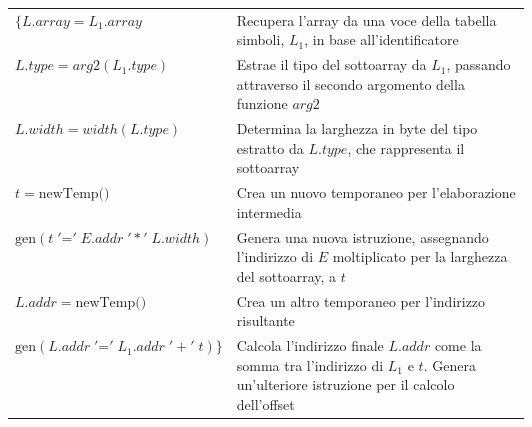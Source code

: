 \documentclass[11pt]{article}
\begin{document}
\begin{center}
  \begin{tabularx}{\linewidth}{l m{0.6\linewidth}}
  $\{L.array = L_1.array$
      & \small Recupera l'array da una voce della tabella simboli, $L_1$, in base all'identificatore \\[0.3cm]
  
  $L.type = arg2(L_1.type)$
      & \small Estrae il tipo del sottoarray da $L_1$, passando attraverso il secondo argomento della funzione $arg2$ \\[0.3cm]
  
  $ L.width = width(L.type) $
      & \small Determina la larghezza in byte del tipo estratto da $L.type$, che rappresenta il sottoarray \\[0.3cm]
  
  $ t = \text{newTemp()} $
      & \small Crea un nuovo temporaneo per l'elaborazione intermedia \\[0.3cm]
  
  $ \text{gen}(t \;'\mathord{=}'\; E.addr \;'*'\; L.width)$
      & \small Genera una nuova istruzione, assegnando l'indirizzo di $E$ moltiplicato per la larghezza del sottoarray, a $t$ \\[0.3cm]
  
  $ L.addr = \text{newTemp()} $
      & \small Crea un altro temporaneo per l'indirizzo risultante \\[0.3cm]
  
  $ \text{gen}(L.addr \;'\mathord{=}'\; L_1.addr \;'+'\; t )\}$
      & \small Calcola l'indirizzo finale $L.addr$ come la somma tra l'indirizzo di $L_1$ e $t$. Genera un'ulteriore istruzione per il calcolo dell'offset \\
  \end{tabularx}  
\end{center}
\end{document}
